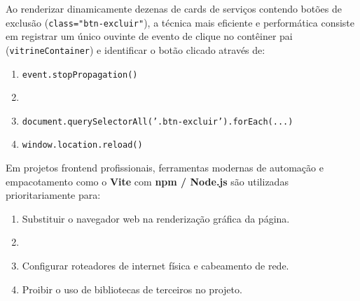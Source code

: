 \begin{tcolorbox}[colback=white, colframe=azulTitulo, title=\textbf{Questão 13: Delegação de Eventos no DOM}]
    Ao renderizar dinamicamente dezenas de cards de serviços contendo botões de exclusão (\texttt{class="btn-excluir"}), a técnica mais eficiente e performática consiste em registrar um único ouvinte de evento de clique no contêiner pai (\texttt{vitrineContainer}) e identificar o botão clicado através de:
    \begin{enumerate}[label=\alph*)]
        \item \texttt{event.stopPropagation()}
        \item {}
        \item \texttt{document.querySelectorAll('.btn-excluir').forEach(...)}
        \item \texttt{window.location.reload()}
    \end{enumerate}
\end{tcolorbox}

\begin{tcolorbox}[colback=white, colframe=azulTitulo, title=\textbf{Questão 14: Ecossistemas Web Modernos e Ferramentas de Build (Vite)}]
    Em projetos frontend profissionais, ferramentas modernas de automação e empacotamento como o \textbf{Vite} com \textbf{npm / Node.js} são utilizadas prioritariamente para:
    \begin{enumerate}[label=\alph*)]
        \item Substituir o navegador web na renderização gráfica da página.
        \item {}
        \item Configurar roteadores de internet física e cabeamento de rede.
        \item Proibir o uso de bibliotecas de terceiros no projeto.
    \end{enumerate}
\end{tcolorbox}

